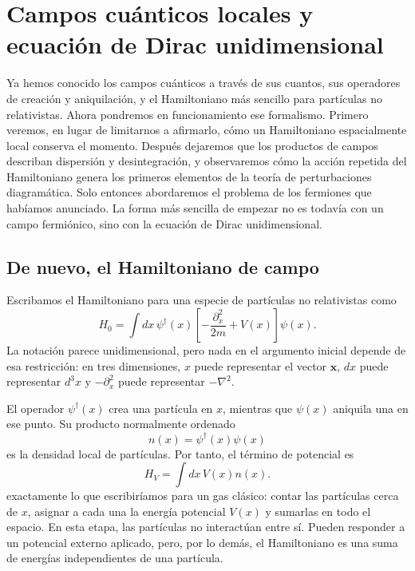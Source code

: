 \chapter{Campos cuánticos locales y ecuación de Dirac unidimensional}

Ya hemos conocido los campos cuánticos a través de sus cuantos, sus operadores de creación y aniquilación, y el Hamiltoniano más sencillo para partículas no relativistas. Ahora pondremos en funcionamiento ese formalismo. Primero veremos, en lugar de limitarnos a afirmarlo, cómo un Hamiltoniano espacialmente local conserva el momento. Después dejaremos que los productos de campos describan dispersión y desintegración, y observaremos cómo la acción repetida del Hamiltoniano genera los primeros elementos de la teoría de perturbaciones diagramática. Solo entonces abordaremos el problema de los fermiones que habíamos anunciado. La forma más sencilla de empezar no es todavía con un campo fermiónico, sino con la ecuación de Dirac unidimensional.

\section{De nuevo, el Hamiltoniano de campo}

Escribamos el Hamiltoniano para una especie de partículas no relativistas como
\begin{equation}
H_0=\int dx\,
\psi^\dagger(x)
\left[-\frac{\partial_x^2}{2m}+V(x)\right]
\psi(x).
\label{eq:l9-nonrel-hamiltonian}
\end{equation}
La notación parece unidimensional, pero nada en el argumento inicial depende de esa restricción: en tres dimensiones, \(x\) puede representar el vector \(\mathbf{x}\), \(dx\) puede representar \(d^3x\) y \(-\partial_x^2\) puede representar \(-\nabla^2\).

El operador \(\psi^\dagger(x)\) crea una partícula en \(x\), mientras que \(\psi(x)\) aniquila una en ese punto. Su producto normalmente ordenado
\begin{equation}
n(x)=\psi^\dagger(x)\psi(x)
\end{equation}
es la densidad local de partículas. Por tanto, el término de potencial es
\begin{equation}
H_V=\int dx\,V(x)n(x).
\end{equation}
exactamente lo que escribiríamos para un gas clásico: contar las partículas cerca de \(x\), asignar a cada una la energía potencial \(V(x)\) y sumarlas en todo el espacio. En esta etapa, las partículas no interactúan entre sí. Pueden responder a un potencial externo aplicado, pero, por lo demás, el Hamiltoniano es una suma de energías independientes de una partícula.

